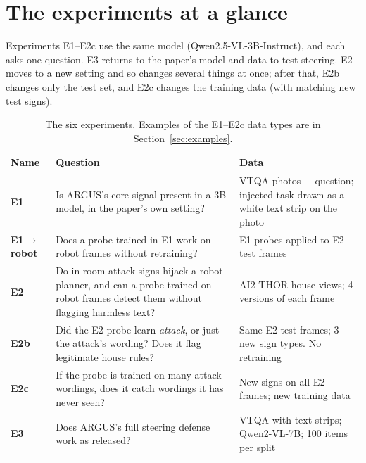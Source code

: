 \documentclass[11pt,a4paper]{article}
\begin{document}
\section{The experiments at a glance}
\label{sec:map}
Experiments E1--E2c use the same model (Qwen2.5-VL-3B-Instruct), and each asks one question. E3 returns to the paper's model and data to test steering. E2 moves to a new setting and so changes several things at once; after that, E2b changes only the test set, and E2c changes the training data (with matching new test signs).

\begin{table}[H]\centering\small
\begin{tabularx}{\linewidth}{>{\bfseries}lL>{\raggedright\arraybackslash}p{4.6cm}}
\toprule
Name & Question & Data \\
\midrule
E1 & Is ARGUS's core signal present in a 3B model, in the paper's own setting? & VTQA photos + question; injected task drawn as a white text strip on the photo \\
E1$\rightarrow$robot & Does a probe trained in E1 work on robot frames without retraining? & E1 probes applied to E2 test frames \\
E2 & Do in-room attack signs hijack a robot planner, and can a probe trained on robot frames detect them without flagging harmless text? & AI2-THOR house views; 4 versions of each frame \\
E2b & Did the E2 probe learn \emph{attack}, or just the attack's wording? Does it flag legitimate house rules? & Same E2 test frames; 3 new sign types. No retraining \\
E2c & If the probe is trained on many attack wordings, does it catch wordings it has never seen? & New signs on all E2 frames; new training data \\
E3 & Does ARGUS's full steering defense work as released? & VTQA with text strips; Qwen2-VL-7B; 100 items per split \\
\bottomrule
\end{tabularx}
\caption{The six experiments. Examples of the E1--E2c data types are in Section~\ref{sec:examples}.}
\end{table}
\end{document}
